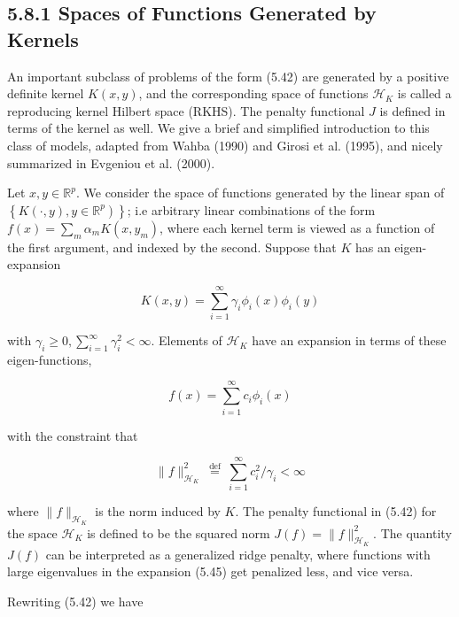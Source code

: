 \documentclass[10pt]{article}
\begin{document}
\subsection*{5.8.1 Spaces of Functions Generated by Kernels}
An important subclass of problems of the form (5.42) are generated by a positive definite kernel $K(x, y)$, and the corresponding space of functions $\mathcal{H}_{K}$ is called a reproducing kernel Hilbert space (RKHS). The penalty functional $J$ is defined in terms of the kernel as well. We give a brief and simplified introduction to this class of models, adapted from Wahba (1990) and Girosi et al. (1995), and nicely summarized in Evgeniou et al. (2000).

Let $x, y \in \mathbb{R}^{p}$. We consider the space of functions generated by the linear span of $\left.\left\{K(\cdot, y), y \in \mathbb{R}^{p}\right)\right\}$; i.e arbitrary linear combinations of the form $f(x)=\sum_{m} \alpha_{m} K\left(x, y_{m}\right)$, where each kernel term is viewed as a function of the first argument, and indexed by the second. Suppose that $K$ has an eigen-expansion


\begin{equation*}
K(x, y)=\sum_{i=1}^{\infty} \gamma_{i} \phi_{i}(x) \phi_{i}(y) \tag{5.45}
\end{equation*}


with $\gamma_{i} \geq 0, \sum_{i=1}^{\infty} \gamma_{i}^{2}<\infty$. Elements of $\mathcal{H}_{K}$ have an expansion in terms of these eigen-functions,


\begin{equation*}
f(x)=\sum_{i=1}^{\infty} c_{i} \phi_{i}(x) \tag{5.46}
\end{equation*}


with the constraint that


\begin{equation*}
\|f\|_{\mathcal{H}_{K}}^{2} \stackrel{\text { def }}{=} \sum_{i=1}^{\infty} c_{i}^{2} / \gamma_{i}<\infty \tag{5.47}
\end{equation*}


where $\|f\|_{\mathcal{H}_{K}}$ is the norm induced by $K$. The penalty functional in (5.42) for the space $\mathcal{H}_{K}$ is defined to be the squared norm $J(f)=\|f\|_{\mathcal{H}_{K}}^{2}$. The quantity $J(f)$ can be interpreted as a generalized ridge penalty, where functions with large eigenvalues in the expansion (5.45) get penalized less, and vice versa.

Rewriting (5.42) we have
\end{document}
